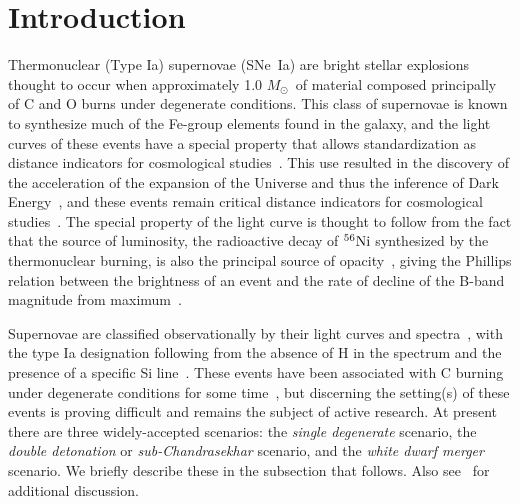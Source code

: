 \documentclass[iop,apj]{emulateapj}
\newcommand{\SNeIa}{SNe~Ia}
\newcommand{\Ni}[1]{\ensuremath{{}^{#1}{\rm Ni}}}
\newcommand{\Msun}{\ensuremath{M_\odot}}
\newcommand\blust{\bgroup\markoverwith{\textcolor{blue}{\rule[0.5ex]{2pt}{0.4pt}}}\ULon}
\begin{document}

\section{Introduction}
\label{sec:intro}

Thermonuclear (Type Ia) supernovae (\SNeIa) are bright stellar explosions
thought to occur when approximately 1.0 \Msun\ of material composed principally
of C and O burns under degenerate conditions. This class of supernovae is
known to synthesize much of the Fe-group elements found in the galaxy, and
the light curves of these events have a special property that allows
standardization \blust{of their light curves and thus use}
as distance indicators for cosmological studies~\citep{phillips:absolute}.
This use resulted in the discovery of the acceleration of the expansion of
the Universe and thus the inference of Dark
Energy~\citep{riess.filippenko.ea:observational,
perlmutter.aldering.ea:measurements,leibundgut2001}, and these events
remain critical distance indicators for cosmological studies~\citep{weinbergetal2013}.
The special property of the light curve is thought to follow
from the fact that the source of luminosity, the radioactive decay
of \Ni{56} synthesized by the thermonuclear burning, is also the
principal source of opacity~\citep{Pinto2001The-type-Ia-sup}, giving
the Phillips relation between the brightness of an event and the
rate of decline of the B-band magnitude from maximum~\citep{phillips:absolute}.

Supernovae are classified observationally
by their light curves and spectra~\citep{minkowski41,bertola64,porterfilippenko87,
wheelerharkness1990conf,Fili97}, with the type Ia designation following from
the absence of H in the spectrum and the presence of a specific Si
line~\citep{filippenko:optical,hillebrandt.niemeyer:type}. These events
have been associated with C burning under degenerate conditions
for some time~\citep{hoylefowler60,arnett.truran.ea:nucleosynthesis},
but discerning the setting(s) of these events is proving difficult
and remains the subject of active research. At present there are three
widely-accepted scenarios: the {\em single degenerate} scenario,
the {\em double detonation} or {\em sub-Chandrasekhar} scenario, and
the {\em white dwarf merger} scenario.
We briefly describe these in the subsection that follows.
Also see~\citet{hillebrandt.niemeyer:type,howell2011,hillebrandtetal2013,calderetal2013,roepkesim2018}
for additional discussion.
\end{document}

